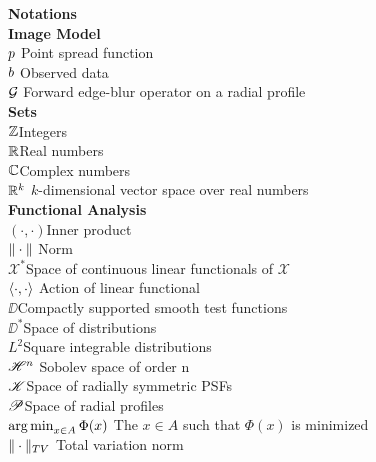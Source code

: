{\bf {\Large Notations}} \\

{\bf {\large Image Model}}\\
$p \dotfill$ Point spread function\\
$b \dotfill$ Observed data\\
$\G \dotfill$ Forward edge-blur operator on a radial profile\\
%
{\bf {\large Sets}}\\
$\mathbb Z$\dotfill Integers\\
$\mathbb R$\dotfill Real numbers\\
$\mathbb C$\dotfill Complex numbers\\
$\mathbb R^k$  \dotfill $k$-dimensional vector space over real numbers\\
%
{\bf {\large Functional Analysis}}\\
$(\cdot,\cdot)$\dotfill Inner product\\
$\|\cdot \| \dotfill$ Norm\\
$\mathscr X^*$\dotfill Space of continuous linear functionals of $\mathscr X$\\
$\langle \cdot,\cdot \rangle \dotfill$ Action of linear functional\\
$\DD$\dotfill Compactly supported smooth test functions\\
$\DD^*$\dotfill Space of distributions\\
$L^2$\dotfill Square integrable distributions\\
$\HH^n \dotfill$ Sobolev space of order n\\
$\mathscr K$\dotfill Space of radially symmetric PSFs\\
$\mathscr P$\dotfill Space of radial profiles\\
$\argmin_{x\in A} \Phi(x) \dotfill$ The $x\in A$ such that $\Phi(x)$ is minimized\\
$\|\cdot \|_{TV} \dotfill$ Total variation norm\\
%
